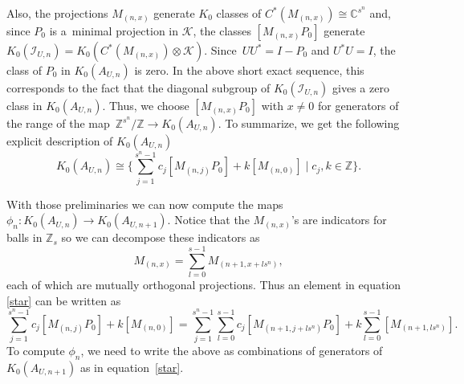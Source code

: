 \documentclass[pdftex]{sigma}
\newcommand{\C}{{\mathbb C}}
\newcommand{\Z}{{\mathbb Z}}
\newcommand{\kcal}{{\mathcal K}}
\newcommand{\fancyI}{\mathcal{I}}
\numberwithin{equation}{section}
\begin{document}
Also, the projections $M_{(n,x)}$ generate $K_0$ classes of $C^*(M_{(n,x)}) \cong \C^{s^n}$ and, since $P_0$ is a~minimal projection in $\kcal$, the classes $[M_{(n,x)}P_0]$ generate $K_0(\fancyI_{U,n})=K_0(C^*(M_{(n,x)})\otimes \kcal)$. Since~${UU^*=I-P_0}$ and $U^*U=I$, the class of $P_0$ in $K_0(A_{U,n})$ is zero. In the above short exact sequence, this corresponds to the fact that the diagonal subgroup of $K_0(\fancyI_{U,n})$ gives a zero class in $K_0(A_{U,n})$. Thus, we choose $[M_{(n,x)}P_0]$ with $x\ne 0$ for generators of the range of the map~${ \Z^{s^n}/\Z \to K_0(A_{U,n})}$. To summarize, we get the following explicit description of $K_0(A_{U,n})$
\begin{equation}\label{star}
K_0(A_{U,n}) \cong \Biggl\{\sum_{j=1}^{s^n-1} c_j[M_{(n,j)}P_0] + k[M_{(n,0)}] \mid c_j,k\in \Z \Biggr\}.
\end{equation}

With those preliminaries we can now compute the maps $\phi_n \colon K_0(A_{U,n}) \to K_0(A_{U,n+1})$. Notice that the $M_{(n,x)}$'s are indicators for balls in $\Z_s$ so we can decompose these indicators as
\begin{equation*}
M_{(n,x)} = \sum_{l=0}^{s-1} M_{(n+1,x+ls^n)},
\end{equation*}
each of which are mutually orthogonal projections. Thus an element in equation \eqref{star} can be written as
\begin{equation}
\sum_{j=1}^{s^n-1} c_j[M_{(n,j)}P_0] + k[M_{(n,0)}] =
\sum_{j=1}^{s^n-1} \sum_{l=0}^{s-1} c_j [M_{(n+1,j+ls^n)}P_0] + k \sum_{l=0}^{s-1} [M_{(n+1,ls^n)}].\label{starstar}
\end{equation}
To compute $\phi_n$, we need to write the above as combinations of generators of $K_0(A_{U,n+1})$ as in equation~\eqref{star}.
\end{document}
